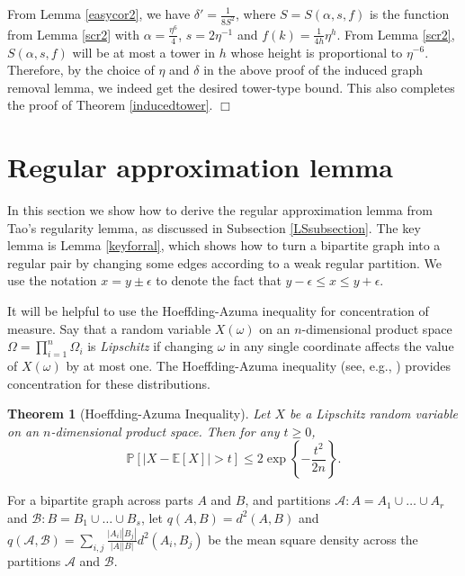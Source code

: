 \documentclass[11pt]{article}
\newtheorem{theorem}{Theorem}[section]
\newcommand{\pr}[1]{\mathbb{P}\left[#1\right]}
\newcommand{\E}[1]{\mathbb{E}\left[#1\right]}
\newenvironment{proof}
      {\medskip\noindent{\bf Proof:}\hspace{1mm}}
      {\hfill$\Box$\medskip}
\begin{document}
\begin{proof}
From Lemma \ref{easycor2}, we have $\delta' = \frac{1}{8S^2}$, where $S = S(\alpha, s, f)$ is the function from Lemma \ref{scr2} with $\alpha = \frac{\eta^6}{4}$, $s = 2 \eta^{-1}$ and $f(k) = \frac{1}{4h} \eta^h$. From Lemma \ref{scr2}, $S(\alpha, s, f)$ will be at most a tower in $h$ whose height is proportional to $\eta^{-6}$. Therefore, by the choice of $\eta$ and $\delta$ in the above proof of the induced graph removal lemma, we indeed get the desired tower-type bound. This also completes the proof of Theorem \ref{inducedtower}. \end{proof}

\section{Regular approximation lemma} \label{RALsection}

In this section we show how to derive the regular approximation lemma from
Tao's regularity lemma, as discussed in Subsection \ref{LSsubsection}. The key
lemma is Lemma \ref{keyforral}, which shows how to turn a bipartite graph into
a regular pair by changing some edges according to a weak regular partition.
We use the notation $x = y \pm \epsilon$ to denote the fact that $y-\epsilon
\leq x \leq y+\epsilon$.

It will be helpful to use the Hoeffding-Azuma inequality for concentration of
measure. Say that a random variable $X(\omega)$ on an $n$-dimensional product
space $\Omega = \prod_{i=1}^n \Omega_i$ is
\emph{Lipschitz}\/ if changing $\omega$ in any single coordinate
affects the value of $X(\omega)$ by at most one.  The Hoeffding-Azuma
inequality (see, e.g., \cite{AlSp}) provides concentration for these
distributions.

\begin{theorem}[Hoeffding-Azuma Inequality]
  \label{thm:azuma}
  Let $X$ be a Lipschitz random variable on an $n$-dimensional
  product space.  Then for any $t \geq 0$,
  \begin{displaymath}
    \pr{ | X - \E{X} | > t }
    \leq
    2 \exp\left\{
      -\frac{t^2}{2n}
    \right\}.
  \end{displaymath}
\end{theorem}

For a bipartite graph across parts $A$ and $B$, and partitions
$\mathcal{A}:A=A_1 \cup \ldots \cup A_r$ and $\mathcal{B}:B=B_1 \cup \ldots
\cup B_s$, let $q(A,B)=d^2(A,B)$ and
$q(\mathcal{A}, \mathcal{B}) = \sum_{i,j}\frac{|A_i||B_j|}{|A||B|}d^2(A_i,B_j)$
be the mean square density across the partitions $\mathcal{A}$ and
$\mathcal{B}$.
\end{document}
